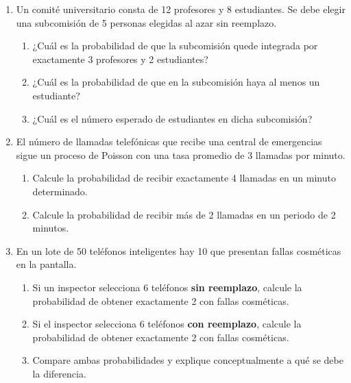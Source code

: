 \documentclass[letterpaper,12pt,spanish]{article}
\begin{document}
\begin{enumerate}[label=\textbf{\arabic*.}]
    \vspace{0.3cm}

    \item Un comité universitario consta de 12 profesores y 8 estudiantes. Se debe elegir una subcomisión de 5 personas elegidas al azar sin reemplazo.
    \begin{enumerate}[label=\alph*)]
        \item ¿Cuál es la probabilidad de que la subcomisión quede integrada por exactamente 3 profesores y 2 estudiantes?
        \item ¿Cuál es la probabilidad de que en la subcomisión haya al menos un estudiante?
        \item ¿Cuál es el número esperado de estudiantes en dicha subcomisión?
    \end{enumerate}

    \vspace{0.3cm}

    \item El número de llamadas telefónicas que recibe una central de emergencias sigue un proceso de Poisson con una tasa promedio de 3 llamadas por minuto.
    \begin{enumerate}[label=\alph*)]
        \item Calcule la probabilidad de recibir exactamente 4 llamadas en un minuto determinado.
        \item Calcule la probabilidad de recibir más de 2 llamadas en un periodo de 2 minutos.
    \end{enumerate}

    \vspace{0.3cm}

    \item En un lote de 50 teléfonos inteligentes hay 10 que presentan fallas cosméticas en la pantalla.
    \begin{enumerate}[label=\alph*)]
        \item Si un inspector selecciona 6 teléfonos \textbf{sin reemplazo}, calcule la probabilidad de obtener exactamente 2 con fallas cosméticas.
        \item Si el inspector selecciona 6 teléfonos \textbf{con reemplazo}, calcule la probabilidad de obtener exactamente 2 con fallas cosméticas.
        \item Compare ambas probabilidades y explique conceptualmente a qué se debe la diferencia.
    \end{enumerate}


\end{enumerate}
\end{document}
